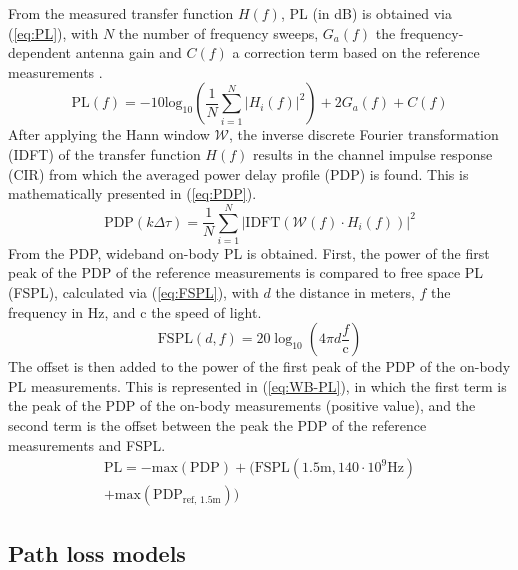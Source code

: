 \documentclass[preprint]{rsl}
\begin{document}
From the measured transfer function $H(f)$, PL (in dB) is obtained via (\ref{eq:PL}), with $N$ the number of frequency sweeps, $G_a(f)$ the frequency-dependent antenna gain and $C(f)$ a correction term based on the reference measurements \cite{DeBeelde2021_eucap}.
\newpage
\begin{equation}
\label{eq:PL}
\text{PL}(f)= -10 \text{log}_{10} \left( \frac{1}{N} \sum_{i=1}^N | H_i(f) |^2 \right) + 2 G_a(f) + C(f)
\end{equation}
After applying the Hann window $\mathcal{W}$, the inverse discrete Fourier transformation (IDFT) of the transfer function $H(f)$ results in the channel impulse response (CIR) from which the averaged power delay profile (PDP) is found. 
This is mathematically presented in (\ref{eq:PDP}).
\begin{equation}
\text{PDP}(k\Delta\tau) = \frac{1}{N} \sum_{i=1}^N | \text{IDFT}(\mathcal{W}(f) \cdot H_i(f)) |^2
\label{eq:PDP}
\end{equation}
From the PDP, wideband on-body PL is obtained. 
First, the power of the first peak of the PDP of the reference measurements is compared to free space PL (FSPL), calculated via (\ref{eq:FSPL}), with $d$ the distance in meters, $f$ the frequency in Hz, and c the speed of light. 
\begin{equation}
\text{FSPL}(d,f)= 20 \log_{10} \left( 4 \pi d \frac{f}{\text{c}}\right)
\label{eq:FSPL}
\end{equation}
The offset is then added to the power of the first peak of the PDP of the on-body PL measurements. 
This is represented in (\ref{eq:WB-PL}), in which the first term is the peak of the PDP of the on-body measurements (positive value), and the second term is the offset between the peak the PDP of the reference measurements and FSPL.
\begin{multline}
\text{PL} = - \text{max}(\text{PDP})  + (\text{FSPL}(1.5 \text{m}, 140\cdot10^9 \text{Hz}) \\ + \text{max}(\text{PDP}_\text{ref, 1.5m}) )
\label{eq:WB-PL}
\end{multline}

\subsection{Path loss models}
\end{document}
